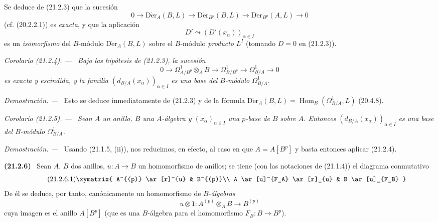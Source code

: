 \documentclass[10pt,oneside]{book}
\makeatletter
\newcommand{\setmanualcurrentlabel}[1]{\def\@currentlabel{#1}}
\newcommand{\oldpage}[2][]{%
  \setcounter{footnote}{0}%
  \marginpar{\scriptsize\textbf{#1}~|~#2}\ignorespaces}
\newenvironment{env}[1][]{\setmanualcurrentlabel{#1}\par\medskip\noindent\textbf{(#1)}\ }{\par}
\newenvironment{corollary}[1][]{%
  \setmanualcurrentlabel{#1}\par\medskip\noindent\itshape Corolario (#1). ---\ }{\par}
\newenvironment{proof}{%
  \par\medskip\noindent\textit{Demostración. ---\ }}{\par}
\makeatother
\begin{document}
Se deduce de (21.2.3) que la sucesión
\begin{equation}
\tag{21.2.3.1}
\label{0.21.2.3.1-es}
0\to\operatorname{D\acute{e}r}_A(B,L)\to\operatorname{D\acute{e}r}_{B^p}(B,L)
\to\operatorname{D\acute{e}r}_{B^p}(A,L)\to0
\end{equation}
(cf. (20.2.2.1)) es \emph{exacta}, y que la aplicación
\begin{equation}
\tag{21.2.3.2}
\label{0.21.2.3.2-es}
D'\leadsto(D'(x_\alpha))_{\alpha\in I}
\end{equation}
es un \emph{isomorfismo} del $B$-módulo $\operatorname{D\acute{e}r}_A(B,L)$ sobre el
$B$-módulo \emph{producto} $L^I$ (tomando $D=0$ en (21.2.3)).

\begin{corollary}[21.2.4]
\label{0.21.2.4-es}
Bajo las hipótesis de \textup{(21.2.3)}, la sucesión
\begin{equation}
\tag{21.2.4.1}
\label{0.21.2.4.1-es}
0\to\Omega^1_{A/B^p}\otimes_A B\to\Omega^1_{B/B^p}
\to\Omega^1_{B/A}\to0
\end{equation}
es exacta y escindida, y la familia $(d_{B/A}(x_\alpha))_{\alpha\in I}$ es
una base del $B$-módulo $\Omega^1_{B/A}$.
\end{corollary}

\begin{proof}
Esto se deduce inmediatamente de (21.2.3) y de la fórmula
$\operatorname{D\acute{e}r}_A(B,L)=\operatorname{Hom}_B(\Omega^1_{B/A},L)$ (20.4.8).
\end{proof}

\begin{corollary}[21.2.5]
\label{0.21.2.5-es}
Sean $A$ un anillo, $B$ una $A$-álgebra y $(x_\alpha)_{\alpha\in I}$ una
$p$-base de $B$ sobre $A$. Entonces $(d_{B/A}(x_\alpha))_{\alpha\in I}$ es
una base del $B$-módulo $\Omega^1_{B/A}$.
\end{corollary}

\begin{proof}
Usando (21.1.5, (ii)), nos reducimos, en efecto, al caso en que $A=A[B^p]$ y basta
entonces aplicar (21.2.4).
\end{proof}

\oldpage[0\textsubscript{IV-1}]{159}
\begin{env}[21.2.6]
\label{0.21.2.6-es}
Sean $A$, $B$ dos anillos, $u:A\to B$ un homomorfismo de anillos; se tiene
(con las notaciones de (21.1.4)) el diagrama conmutativo
\begin{equation}
\tag{21.2.6.1}
\label{0.21.2.6.1-es}
\xymatrix{
 A^{(p)} \ar[r]^{u} & B^{(p)}\\
 A \ar[u]^{F_A} \ar[r]_{u} & B \ar[u]_{F_B}
}
\end{equation}
De él se deduce, por tanto, canónicamente un homomorfismo de $B$-\emph{álgebras}
\begin{equation}
\tag{21.2.6.2}
\label{0.21.2.6.2-es}
u\otimes1:A^{(p)}\otimes_A B\longrightarrow B^{(p)}
\end{equation}
cuya imagen es el anillo $A[B^p]$ (que es una $B$-álgebra para el
homomorfismo $F_B:B\to B^p$).
\end{env}
\end{document}
